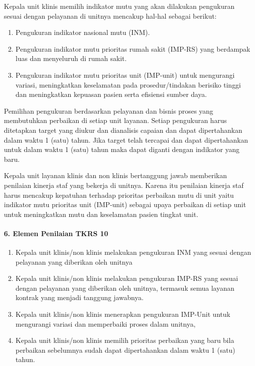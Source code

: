 \documentclass[
]{book}
\providecommand{\tightlist}{%
  \setlength{\itemsep}{0pt}\setlength{\parskip}{0pt}}
\begin{document}
Kepala unit klinis memilih indikator mutu yang akan dilakukan pengukuran sesuai dengan pelayanan di unitnya mencakup hal-hal sebagai berikut:

\begin{enumerate}
\def\labelenumi{\alph{enumi}.}
\tightlist
\item
  Pengukuran indikator nasional mutu (INM).
\item
  Pengukuran indikator mutu prioritas rumah sakit (IMP-RS) yang berdampak luas dan menyeluruh di rumah sakit.
\item
  Pengukuran indikator mutu prioritas unit (IMP-unit) untuk mengurangi variasi, meningkatkan keselamatan pada prosedur/tindakan berisiko tinggi dan meningkatkan kepuasan pasien serta efisiensi sumber daya.
\end{enumerate}

Pemilihan pengukuran berdasarkan pelayanan dan bisnis proses yang membutuhkan perbaikan di setiap unit layanan. Setiap pengukuran harus ditetapkan target yang diukur dan dianalisis capaian dan dapat dipertahankan dalam waktu 1 (satu) tahun. Jika target telah tercapai dan dapat dipertahankan untuk dalam waktu 1 (satu) tahun maka dapat diganti dengan indikator yang baru.

Kepala unit layanan klinis dan non klinis bertanggung jawab memberikan penilaian kinerja staf yang bekerja di unitnya. Karena itu penilaian kinerja staf harus mencakup kepatuhan terhadap prioritas perbaikan mutu di unit yaitu indikator mutu prioritas unit (IMP-unit) sebagai upaya perbaikan di setiap unit untuk meningkatkan mutu dan keselamatan pasien tingkat unit.

\hypertarget{elemen-penilaian-tkrs-10}{%
\paragraph*{6. Elemen Penilaian TKRS 10}\label{elemen-penilaian-tkrs-10}}

\begin{enumerate}
\def\labelenumi{\alph{enumi}.}
\tightlist
\item
  Kepala unit klinis/non klinis melakukan pengukuran INM yang sesuai dengan pelayanan yang diberikan oleh unitnya
\item
  Kepala unit klinis/non klinis melakukan pengukuran IMP-RS yang sesuai dengan pelayanan yang diberikan oleh unitnya, termasuk semua layanan kontrak yang menjadi tanggung jawabnya.
\item
  Kepala unit klinis/non klinis menerapkan pengukuran IMP-Unit untuk mengurangi variasi dan memperbaiki proses dalam unitnya,
\item
  Kepala unit klinis/non klinis memilih prioritas perbaikan yang baru bila perbaikan sebelumnya sudah dapat dipertahankan dalam waktu 1 (satu) tahun.
\end{enumerate}
\end{document}
